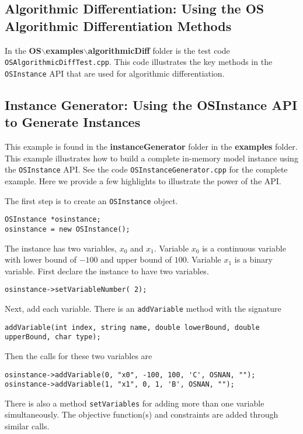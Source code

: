 \documentclass[11pt]{article}
\renewcommand{\{}{{\char"7B}}
\renewcommand{\}}{{\char"7D}}
\renewcommand{\^}{{\char"0D}}
\renewcommand{\'}{{\char"0D}}
\begin{document}
\subsection{Algorithmic Differentiation:  Using the OS Algorithmic Differentiation Methods}\label{section:cppad}

In the {\bf OS$\backslash$examples$\backslash$algorithmicDiff} folder is the test code 
{\tt OSAlgorithmicDiffTest.cpp}. This code illustrates the key methods in the 
{\tt OSInstance} API that are used for algorithmic differentiation.   


\subsection{Instance Generator: Using the OSInstance API to Generate Instances}\label{section:exampleOSInstanceGeneration}

This example is found in the {\bf instanceGenerator} folder in the {\bf examples} folder. This example illustrates
how to build a complete in-memory model instance using the {\tt OSInstance} API.
See the code {\tt OSInstanceGenerator.cpp} for the complete example. Here we provide a few highlights to illustrate
the power of the API.

The first step is to create an {\tt OSInstance} object.
\begin{verbatim}
OSInstance *osinstance;
osinstance = new OSInstance();
\end{verbatim}

The instance has two variables, $x_{0}$ and $x_{1}$. Variable $x_{0}$ is a continuous variable with lower bound of $-100$ and upper bound of $100$. Variable $x_{1}$ is a binary variable. First declare the instance to have two variables.
\begin{verbatim}
osinstance->setVariableNumber( 2);
\end{verbatim}
Next, add each variable. There is an {\tt addVariable} method with the signature
\begin{verbatim}
addVariable(int index, string name, double lowerBound, double upperBound, char type);
\end{verbatim}
Then the calls for these two variables are
\begin{verbatim}
osinstance->addVariable(0, "x0", -100, 100, 'C', OSNAN, "");
osinstance->addVariable(1, "x1", 0, 1, 'B', OSNAN, "");
\end{verbatim}
There is also a method {\tt setVariables} for adding more than one variable simultaneously.  The objective function(s) 
and constraints are added through similar calls.
\end{document}
